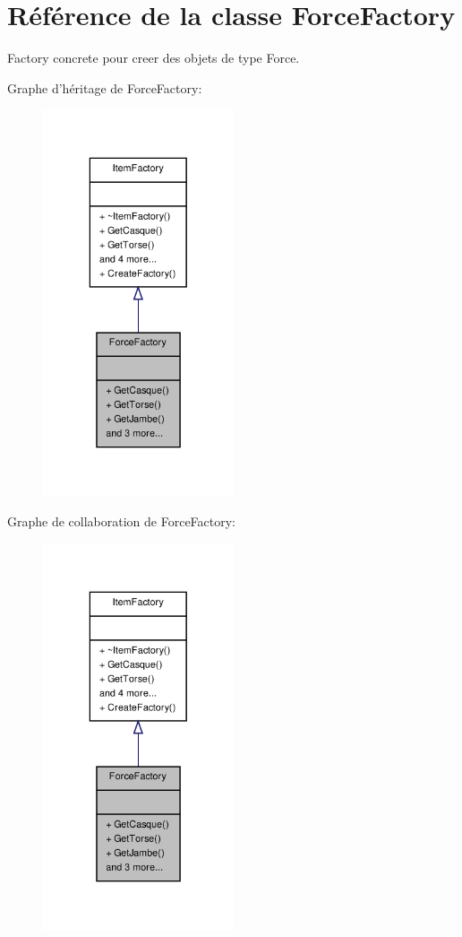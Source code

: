\hypertarget{class_force_factory}{\section{Référence de la classe Force\-Factory}
\label{class_force_factory}
}


Factory concrete pour creer des objets de type Force.  




Graphe d'héritage de Force\-Factory\-:
\nopagebreak
\begin{figure}[H]
\begin{center}
\leavevmode
\includegraphics[width=160pt]{class_force_factory__inherit__graph}
\end{center}
\end{figure}


Graphe de collaboration de Force\-Factory\-:
\nopagebreak
\begin{figure}[H]
\begin{center}
\leavevmode
\includegraphics[width=160pt]{class_force_factory__coll__graph}
\end{center}
\end{figure}

